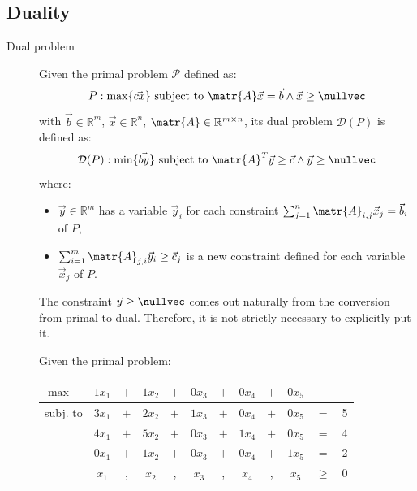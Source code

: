 \subsection{Duality}

\begin{description}
    \item[Dual problem]
        Given the primal problem $\mathcal{P}$ defined as: 
        \[ P: \max \{\vec{cx}\} \text{ subject to } \matr{A}\vec{x} = \vec{b} \land \vec{x} \geq \nullvec \]
        with $\vec{b} \in \mathbb{R}^m$, $\vec{x} \in \mathbb{R}^n$, $\matr{A} \in \mathbb{R}^{m \times n}$,
        its dual problem $\mathcal{D}(P)$ is defined as:
        \[ \mathcal{D}(P): \min\{\vec{by}\} \text{ subject to } \matr{A}^T\vec{y} \geq \vec{c} \land \vec{y} \geq \nullvec \]
        where:
        \begin{itemize}
            \item $\vec{y} \in \mathbb{R}^m$ has a variable $\vec{y}_i$ for each constraint $\sum_{j=1}^{n} \matr{A}_{i,j} \vec{x}_j = \vec{b}_i$ of $P$,
            \item $\sum_{i=1}^{m} \matr{A}_{j, i} \vec{y}_i \geq \vec{c}_j$ is a new constraint defined for each variable $\vec{x}_j$ of $P$.
        \end{itemize} 

        \begin{remark}
            The constraint $\vec{y} \geq \nullvec$ comes out naturally from the conversion from primal to dual.
            Therefore, it is not strictly necessary to explicitly put it.
        \end{remark}

        \begin{example}
            Given the primal problem:
            \begin{center}
                \begin{tabular}{lccccccccccc}
                    \toprule
                    $\max$ & $1x_1$ & $+$ & $1x_2$ & $+$ & \color{lightgray}$0x_3$ & $+$ & \color{lightgray}$0x_4$ & $+$ & \color{lightgray}$0x_5$ \\
                    \midrule
                    subj. to & $3x_1$ & $+$ & $2x_2$ & $+$ & $1x_3$ & $+$ & \color{lightgray}$0x_4$ & $+$ & \color{lightgray}$0x_5$ & $=$ & 5 \\
                             & $4x_1$ & $+$ & $5x_2$ & $+$ & \color{lightgray}$0x_3$ & $+$ & $1x_4$ & $+$ & \color{lightgray}$0x_5$ & $=$ & 4 \\
                             & \color{lightgray}$0x_1$ & $+$ & $1x_2$ & $+$ & \color{lightgray}$0x_3$ & $+$ & \color{lightgray}$0x_4$ & $+$ & $1x_5$ & $=$ & 2 \\
                    \midrule
                            & $x_1$ & , & $x_2$ & , & $x_3$ & , & $x_4$ & , & $x_5$ & $\geq$ & 0 \\
                    \bottomrule
                \end{tabular}
            \end{center}


\end{example}
\end{description}
